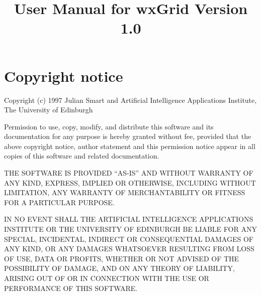 
\parskip=10pt
\parindent=0pt
\title{User Manual for wxGrid Version 1.0}
\makeindex

\maketitle
\pagestyle{fancyplain}

\setfooter{\thepage}{}{}{}{}{\thepage}%
\tableofcontents

\chapter*{Copyright notice}
%
\setfooter{\thepage}{}{}{}{}{\thepage}%

\begin{center}
Copyright (c) 1997 Julian Smart and Artificial Intelligence Applications Institute,
The University of Edinburgh\\
\end{center}

Permission to use, copy, modify, and distribute this software and its
documentation for any purpose is hereby granted without fee, provided that the
above copyright notice, author statement and this permission notice appear in
all copies of this software and related documentation.

THE SOFTWARE IS PROVIDED ``AS-IS'' AND WITHOUT WARRANTY OF ANY KIND, EXPRESS,
IMPLIED OR OTHERWISE, INCLUDING WITHOUT LIMITATION, ANY WARRANTY OF
MERCHANTABILITY OR FITNESS FOR A PARTICULAR PURPOSE.

IN NO EVENT SHALL THE ARTIFICIAL INTELLIGENCE APPLICATIONS INSTITUTE OR THE
UNIVERSITY OF EDINBURGH BE LIABLE FOR ANY SPECIAL, INCIDENTAL, INDIRECT OR
CONSEQUENTIAL DAMAGES OF ANY KIND, OR ANY DAMAGES WHATSOEVER RESULTING FROM
LOSS OF USE, DATA OR PROFITS, WHETHER OR NOT ADVISED OF THE POSSIBILITY OF
DAMAGE, AND ON ANY THEORY OF LIABILITY, ARISING OUT OF OR IN CONNECTION WITH
THE USE OR PERFORMANCE OF THIS SOFTWARE.





\newpage

%
\setfooter{\thepage}{}{}{}{}{\thepage}%
\printindex


